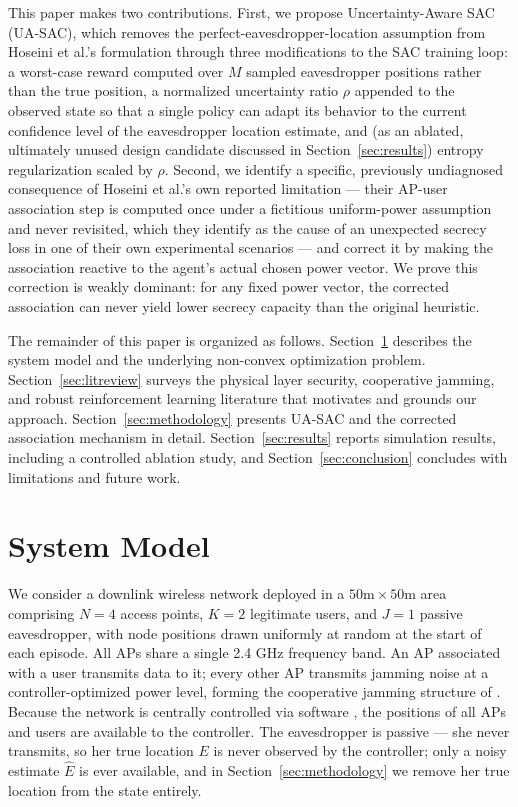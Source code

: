 \documentclass[conference]{IEEEtran}
\begin{document}
This paper makes two contributions. First, we propose Uncertainty-Aware SAC (UA-SAC), which removes the perfect-eavesdropper-location assumption from Hoseini et al.'s formulation through three modifications to the SAC training loop: a worst-case reward computed over $M$ sampled eavesdropper positions rather than the true position, a normalized uncertainty ratio $\rho$ appended to the observed state so that a single policy can adapt its behavior to the current confidence level of the eavesdropper location estimate, and (as an ablated, ultimately unused design candidate discussed in Section~\ref{sec:results}) entropy regularization scaled by $\rho$. Second, we identify a specific, previously undiagnosed consequence of Hoseini et al.'s own reported limitation --- their AP-user association step is computed once under a fictitious uniform-power assumption and never revisited, which they identify as the cause of an unexpected secrecy loss in one of their own experimental scenarios --- and correct it by making the association reactive to the agent's actual chosen power vector. We prove this correction is weakly dominant: for any fixed power vector, the corrected association can never yield lower secrecy capacity than the original heuristic.

The remainder of this paper is organized as follows. Section~\ref{sec:sysmodel} describes the system model and the underlying non-convex optimization problem. Section~\ref{sec:litreview} surveys the physical layer security, cooperative jamming, and robust reinforcement learning literature that motivates and grounds our approach. Section~\ref{sec:methodology} presents UA-SAC and the corrected association mechanism in detail. Section~\ref{sec:results} reports simulation results, including a controlled ablation study, and Section~\ref{sec:conclusion} concludes with limitations and future work.

\section{System Model}
\label{sec:sysmodel}

We consider a downlink wireless network deployed in a $50\text{m} \times 50\text{m}$ area comprising $N=4$ access points, $K=2$ legitimate users, and $J=1$ passive eavesdropper, with node positions drawn uniformly at random at the start of each episode. All APs share a single 2.4 GHz frequency band. An AP associated with a user transmits data to it; every other AP transmits jamming noise at a controller-optimized power level, forming the cooperative jamming structure of \cite{hoseini}. Because the network is centrally controlled via software \cite{wifi5,spectrum}, the positions of all APs and users are available to the controller. The eavesdropper is passive --- she never transmits, so her true location $E$ is never observed by the controller; only a noisy estimate $\hat{E}$ is ever available, and in Section~\ref{sec:methodology} we remove her true location from the state entirely.
\end{document}
